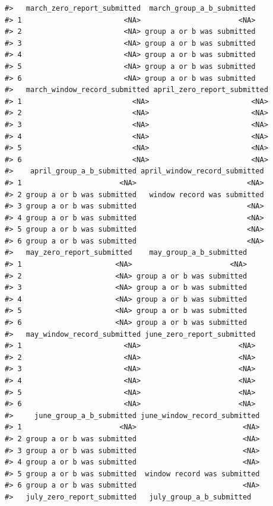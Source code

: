 \documentclass[
]{krantz}
\begin{document}
\begin{verbatim}
#>   march_zero_report_submitted  march_group_a_b_submitted
#> 1                        <NA>                       <NA>
#> 2                        <NA> group a or b was submitted
#> 3                        <NA> group a or b was submitted
#> 4                        <NA> group a or b was submitted
#> 5                        <NA> group a or b was submitted
#> 6                        <NA> group a or b was submitted
#>   march_window_record_submitted april_zero_report_submitted
#> 1                          <NA>                        <NA>
#> 2                          <NA>                        <NA>
#> 3                          <NA>                        <NA>
#> 4                          <NA>                        <NA>
#> 5                          <NA>                        <NA>
#> 6                          <NA>                        <NA>
#>    april_group_a_b_submitted april_window_record_submitted
#> 1                       <NA>                          <NA>
#> 2 group a or b was submitted   window record was submitted
#> 3 group a or b was submitted                          <NA>
#> 4 group a or b was submitted                          <NA>
#> 5 group a or b was submitted                          <NA>
#> 6 group a or b was submitted                          <NA>
#>   may_zero_report_submitted    may_group_a_b_submitted
#> 1                      <NA>                       <NA>
#> 2                      <NA> group a or b was submitted
#> 3                      <NA> group a or b was submitted
#> 4                      <NA> group a or b was submitted
#> 5                      <NA> group a or b was submitted
#> 6                      <NA> group a or b was submitted
#>   may_window_record_submitted june_zero_report_submitted
#> 1                        <NA>                       <NA>
#> 2                        <NA>                       <NA>
#> 3                        <NA>                       <NA>
#> 4                        <NA>                       <NA>
#> 5                        <NA>                       <NA>
#> 6                        <NA>                       <NA>
#>     june_group_a_b_submitted june_window_record_submitted
#> 1                       <NA>                         <NA>
#> 2 group a or b was submitted                         <NA>
#> 3 group a or b was submitted                         <NA>
#> 4 group a or b was submitted                         <NA>
#> 5 group a or b was submitted  window record was submitted
#> 6 group a or b was submitted                         <NA>
#>   july_zero_report_submitted   july_group_a_b_submitted

\end{verbatim}
\end{document}
